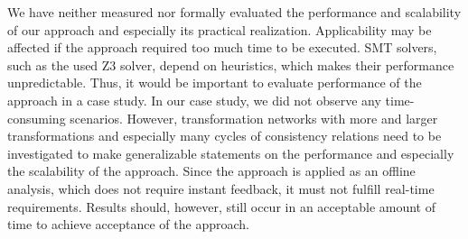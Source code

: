 
We have neither measured nor formally evaluated the performance and scalability of our approach and especially its practical realization.
Applicability may be affected if the approach required too much time to be executed.
\gls{SMT} solvers, such as the used Z3 solver, depend on heuristics, which makes their performance unpredictable.
Thus, it would be important to evaluate performance of the approach in a case study.
In our case study, %
we did not observe any time-consuming scenarios.
However, transformation networks with more and larger transformations and especially many cycles of consistency relations need to be investigated to make generalizable statements on the performance and especially the scalability of the approach.
Since the approach is applied as an offline analysis, which does not require instant feedback, it must not fulfill real-time requirements.
Results should, however, still occur in an acceptable amount of time to achieve acceptance of the approach.


